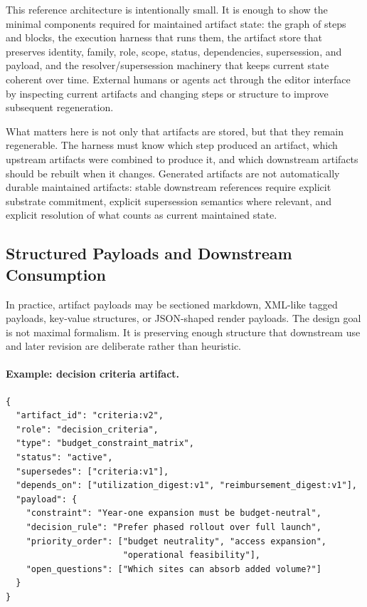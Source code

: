 \documentclass{article}
\begin{document}
This reference architecture is intentionally small. It is enough to show the minimal components required for maintained artifact state: the graph of steps and blocks, the execution harness that runs them, the artifact store that preserves identity, family, role, scope, status, dependencies, supersession, and payload, and the resolver/supersession machinery that keeps current state coherent over time. External humans or agents act through the editor interface by inspecting current artifacts and changing steps or structure to improve subsequent regeneration.

What matters here is not only that artifacts are stored, but that they remain regenerable. The harness must know which step produced an artifact, which upstream artifacts were combined to produce it, and which downstream artifacts should be rebuilt when it changes. Generated artifacts are not automatically durable maintained artifacts: stable downstream references require explicit substrate commitment, explicit supersession semantics where relevant, and explicit resolution of what counts as current maintained state.

\subsection{Structured Payloads and Downstream Consumption}

In practice, artifact payloads may be sectioned markdown, XML-like tagged payloads, key-value structures, or JSON-shaped render payloads. The design goal is not maximal formalism. It is preserving enough structure that downstream use and later revision are deliberate rather than heuristic.

\paragraph{Example: decision criteria artifact.}

\begin{verbatim}
{
  "artifact_id": "criteria:v2",
  "role": "decision_criteria",
  "type": "budget_constraint_matrix",
  "status": "active",
  "supersedes": ["criteria:v1"],
  "depends_on": ["utilization_digest:v1", "reimbursement_digest:v1"],
  "payload": {
    "constraint": "Year-one expansion must be budget-neutral",
    "decision_rule": "Prefer phased rollout over full launch",
    "priority_order": ["budget neutrality", "access expansion",
                       "operational feasibility"],
    "open_questions": ["Which sites can absorb added volume?"]
  }
}
\end{verbatim}
\end{document}
